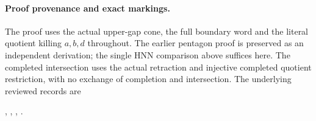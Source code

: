 \paragraph{Proof provenance and exact markings.}
The proof uses the actual upper-gap cone, the full boundary word and
the literal quotient killing $a,b,d$ throughout. The earlier pentagon
proof is preserved as an independent derivation; the single HNN
comparison above suffices here. The completed intersection uses the
actual retraction and injective completed quotient restriction, with
no exchange of completion and intersection. The underlying reviewed
records are
\begingroup\raggedright
{},
,
,
.
\par\endgroup
